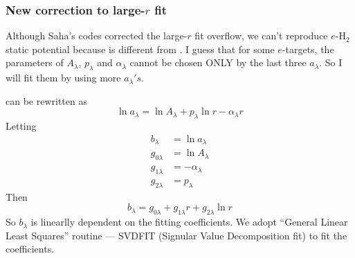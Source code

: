 \documentclass[aps,pra,groupedaddress,
                amsfonts,amssymb,
                preprint
    ]{revtex4}
\begin{document}
\subsubsection{New correction to large-$r$ fit}
Although Saha's codes corrected the large-$r$ fit overflow, we can't
reproduce $e$-H$_2$ static potential because  is different
from . I guess that for some $e$-targets, the parameters of
$A_\lambda$, $p_\lambda$ and $\alpha_\lambda$ cannot be chosen ONLY by
the last three $a_\lambda$. So I will fit them by using more
$a_\lambda's$.

 can be rewritten as
\begin{equation}
  \label{eq:lalog}
  \ln a_\lambda = \ln A_\lambda + p_\lambda\ln r - \alpha_\lambda r
\end{equation}
Letting 
\begin{subequations}
  \begin{align}
    \label{eq:lalp}
    b_\lambda & = \ln a_\lambda \\
    g_{0\lambda} & = \ln A_\lambda \\
    g_{1\lambda} & = -\alpha_\lambda \\
    g_{2\lambda} & = p_\lambda
  \end{align}
\end{subequations}
Then
\begin{equation}
  \label{eq:lallog2}
  b_\lambda = g_{0\lambda} + g_{1\lambda}r + g_{2\lambda}\ln r
\end{equation}
So $b_\lambda$ is linearlly dependent on the fitting coefficients. We
adopt ``General Linear Least Squares'' routine --- SVDFIT (Signular
Value Decomposition fit) \cite{PTV1992} to fit the coefficients.
\end{document}
